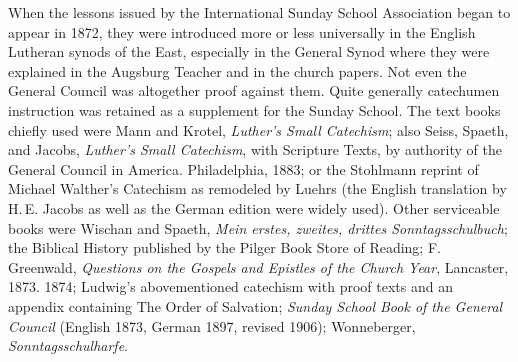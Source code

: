 When the lessons issued by the International Sunday School Association began to appear in 1872, they were introduced more or less universally in the English Lutheran synods of the East, especially in the General Synod where they were explained in the Augsburg Teacher and in the church papers. Not even the General Council was altogether proof against them. Quite generally catechumen instruction was retained as a supplement for the Sunday School. The text books chiefly used were Mann and Krotel, \emph{Luther’s Small Catechism}; also Seiss, Spaeth, and Jacobs, \emph{Luther’s Small Catechism}, with Scripture Texts, by authority of the General Council in America. Philadelphia, 1883; or the Stohlmann reprint of Michael Walther’s Catechism as remodeled by Luehrs (the English translation by H.\,E. Jacobs as well as the German edition were widely used). Other serviceable books were Wischan and Spaeth, \emph{Mein erstes, zweites, drittes Sonntagsschulbuch}; the Biblical History published by the Pilger Book Store of Reading; F. Greenwald, \emph{Questions on the Gospels and Epistles of the Church Year}, Lancaster, 1873. 1874; Ludwig’s abovementioned catechism with proof texts and an appendix containing The Order of Salvation; \emph{Sunday School Book of the General Council} (English 1873, German 1897, revised 1906); Wonneberger, \emph{Sonntagsschulharfe}.

